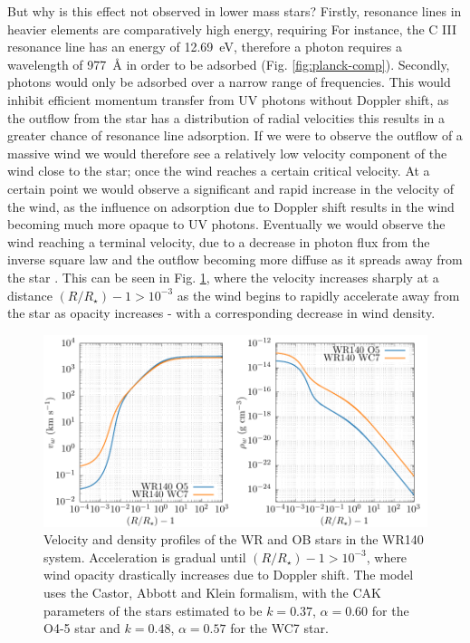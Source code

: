 But why is this effect not observed in lower mass stars?
Firstly, resonance lines in heavier elements are comparatively high energy, requiring 
For instance, the C III resonance line has an energy of \SI{12.69}{\electronvolt}, therefore a photon requires a wavelength of \SI{977}{\angstrom} in order to be adsorbed (Fig. {\ref{fig:planck-comp}}).
Secondly, photons would only be adsorbed over a narrow range of frequencies.
This would inhibit efficient momentum transfer from UV photons without Doppler shift, as the outflow from the star has a distribution of radial velocities this results in a greater chance of resonance line adsorption.
If we were to observe the outflow of a massive wind we would therefore see a relatively low velocity component of the wind close to the star; once the wind reaches a certain critical velocity.
At a certain point we would observe a significant and rapid increase in the velocity of the wind, as the influence on adsorption due to Doppler shift results in the wind becoming much more opaque to UV photons.
Eventually we would observe the wind reaching a terminal velocity, due to a decrease in photon flux from the inverse square law and the outflow becoming more diffuse as it spreads away from the star \parencite[Ch.~10]{maciel_hydrodynamics_2014}.
This can be seen in Fig. \ref{fig:cak-vel}, where the velocity increases sharply at a distance $(R/R_\star) - 1 > 10^{-3}$ as the wind begins to rapidly accelerate away from the star as opacity increases - with a corresponding decrease in wind density.

\begin{figure}
  \centering
  \includegraphics[]{assets/cak/vel.pdf}
  \caption[Radiative line driving velocity and density profile]{Velocity and density profiles of the WR and OB stars in the WR140 system. Acceleration is gradual until $(R/R_\star) - 1 > 10^{-3}$, where wind opacity drastically increases due to Doppler shift. The model uses the Castor, Abbott and Klein formalism, with the CAK parameters of the stars estimated to be $k = 0.37$, $\alpha = 0.60$ for the O4-5 star and $k = 0.48$, $\alpha = 0.57$ for the WC7 star.}
  \label{fig:cak-vel}
\end{figure}

